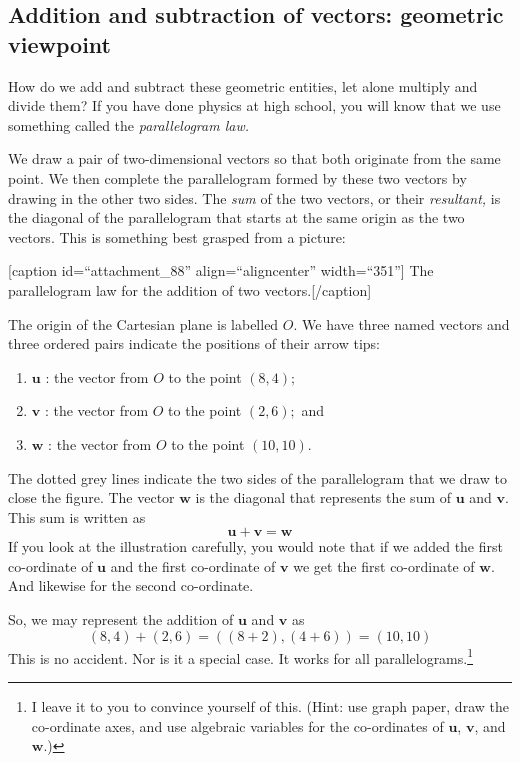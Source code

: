 \documentclass[
  a4paper,
]{article}
\providecommand{\tightlist}{%
  \setlength{\itemsep}{0pt}\setlength{\parskip}{0pt}}
\begin{document}
\hypertarget{addition-and-subtraction-of-vectors-geometric-viewpoint}{%
\subsection{Addition and subtraction of vectors: geometric
viewpoint}\label{addition-and-subtraction-of-vectors-geometric-viewpoint}}

How do we add and subtract these geometric entities, let alone multiply
and divide them? If you have done physics at high school, you will know
that we use something called the \emph{parallelogram law.}

We draw a pair of two-dimensional vectors so that both originate from
the same point. We then complete the parallelogram formed by these two
vectors by drawing in the other two sides. The \emph{sum} of the two
vectors, or their \emph{resultant,} is the diagonal of the parallelogram
that starts at the same origin as the two vectors. This is something
best grasped from a picture:

{[}caption id=``attachment\_88'' align=``aligncenter'' width=``351''{]}
The parallelogram law for the addition of two vectors.{[}/caption{]}

The origin of the Cartesian plane is labelled \(O\). We have three named
vectors and three ordered pairs indicate the positions of their arrow
tips:

\begin{enumerate}
\tightlist
\item
  \(\mathbf{u}\) : the vector from \(O\) to the point \((8, 4);\)
\item
  \(\mathbf{v}\) : the vector from \(O\) to the point \((2, 6);\) and
\item
  \(\mathbf{w}\) : the vector from \(O\) to the point \((10, 10)\).
\end{enumerate}

The dotted grey lines indicate the two sides of the parallelogram that
we draw to close the figure. The vector \(\mathbf{w}\) is the diagonal
that represents the sum of \(\mathbf{u}\) and \(\mathbf{v}\). This sum
is written as \[
\mathbf{u} + \mathbf{v} = \mathbf{w}
\] If you look at the illustration carefully, you would note that if we
added the first co-ordinate of \(\mathbf{u}\) and the first co-ordinate
of \(\mathbf{v}\) we get the first co-ordinate of \(\mathbf{w}\). And
likewise for the second co-ordinate.

So, we may represent the addition of \(\mathbf{u}\) and \(\mathbf{v}\)
as \[
(8, 4) + (2, 6) = ((8+2), (4+6)) = (10, 10)
\] This is no accident. Nor is it a special case. It works for all
parallelograms.\footnote{I leave it to you to convince yourself of this.
  (Hint: use graph paper, draw the co-ordinate axes, and use algebraic
  variables for the co-ordinates of \(\mathbf{u}\), \(\mathbf{v}\), and
  \(\mathbf{w}\).)}
\end{document}
